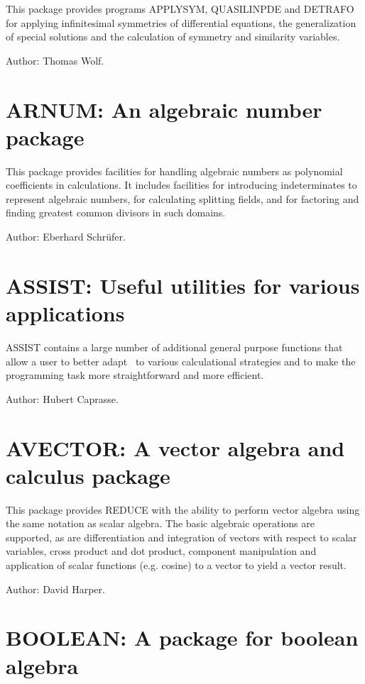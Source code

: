 This package provides programs APPLYSYM, QUASILINPDE and DETRAFO for
applying infinitesimal symmetries of differential equations, the
generalization of special solutions and the calculation of symmetry and
similarity variables.

Author: Thomas Wolf.

\section{ARNUM: An algebraic number package} 

This package provides facilities for handling algebraic numbers as
polynomial coefficients in {\REDUCE} calculations. It includes facilities for
introducing indeterminates to represent algebraic numbers, for calculating
splitting fields, and for factoring and finding greatest common divisors
in such domains.

Author: Eberhard Schr\"ufer.

\section{ASSIST: Useful utilities for various applications} 

ASSIST contains a large number of additional general purpose functions
that allow a user to better adapt \REDUCE\ to various calculational
strategies and to make the programming task more straightforward and more
efficient.

Author: Hubert Caprasse.

\section{AVECTOR: A vector algebra and calculus package} 

This package provides REDUCE with the ability to perform vector algebra
using the same notation as scalar algebra.  The basic algebraic operations
are supported, as are differentiation and integration of vectors with
respect to scalar variables, cross product and dot product, component
manipulation and application of scalar functions (e.g. cosine) to a vector
to yield a vector result.

Author: David Harper.

\section{BOOLEAN: A package for boolean algebra} 

